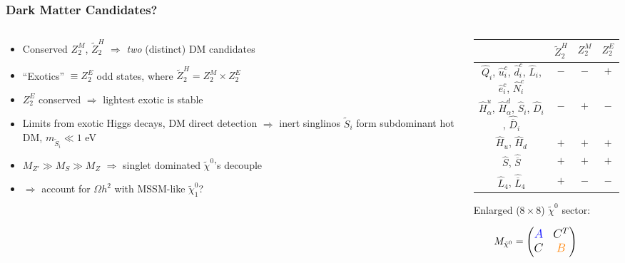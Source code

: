 \documentclass[10pt,aspectratio=169]{beamer}
\begin{document}
\begin{frame}
  \frametitle{Dark Matter Candidates?}
  \vspace{10pt}
  \begin{columns}
    \begin{column}{0.6\textwidth}
      \begin{itemize} \itemsep1.2em
      \item Conserved $Z_2^M$, $\tilde{Z}_2^H$ $\Rightarrow$
        \emph{two} (distinct) DM candidates
        \item ``Exotics'' $\equiv Z_2^E$ odd states, where
          $\tilde{Z}_2^H = Z_2^M \times Z_2^E$
      \item $Z_2^E$ conserved $\Rightarrow$ lightest exotic is stable
      \item Limits from exotic Higgs decays, DM direct detection
        $\Rightarrow$ inert singlinos $\tilde{S}_i$ form subdominant hot DM,
        $m_{\tilde{S}_i} \ll 1$ eV
      \item $M_{Z'} \gg M_S \gg M_Z$ $\Rightarrow$ {\color{orange}
        singlet dominated $\tilde{\chi}^0$'s} decouple
      \item $\Rightarrow$ account for $\Omega h^2$ with
        {\color{blue} MSSM-like $\tilde{\chi}_1^0$}?
      \end{itemize}
    \end{column}
    \begin{column}{0.4\textwidth}
      \begin{table}[ht]
        \centering
        \small
        \begin{tabular}{cccc}
          \toprule
          & $\tilde{Z}_2^H$ & $Z_2^M$ & $Z_2^E$ \\
          \midrule
          $\hat{Q}_i$, $\hat{u}_i^c$, $\hat{d}_i^c$, $\hat{L}_i$, $\hat{e}_i^c$,
          $\hat{N}_i^c$ & $-$ & $-$ & $+$ \\
          $\hat{H}_{\alpha}^u$, $\hat{H}_{\alpha}^d$, $\hat{S}_i$,
          $\hat{D}_i$, $\hat{\overline{D}}_i$ & $-$ & $+$ & $-$ \\
          $\hat{H}_u$, $\hat{H}_d$ & $+$ & $+$ & $+$ \\
          $\hat{S}$, $\hat{\overline{S}}$ & $+$ & $+$ & $+$ \\
          $\hat{L}_4$, $\hat{\overline{L}}_4$ & $+$ & $-$ & $-$ \\
          \bottomrule
        \end{tabular}
      \end{table}
      \vspace{8pt}
      Enlarged ($8 \times 8$) $\tilde{\chi}^0$ sector:
      \begin{center}
        $
        \qquad \large
        M_{\tilde{\chi}^0} = \begin{pmatrix}
          {\color{blue} A} & C^T \\
          C & {\color{orange} B}
        \end{pmatrix}
        $
      \end{center}
    \end{column}
  \end{columns}
\end{frame}
\end{document}

